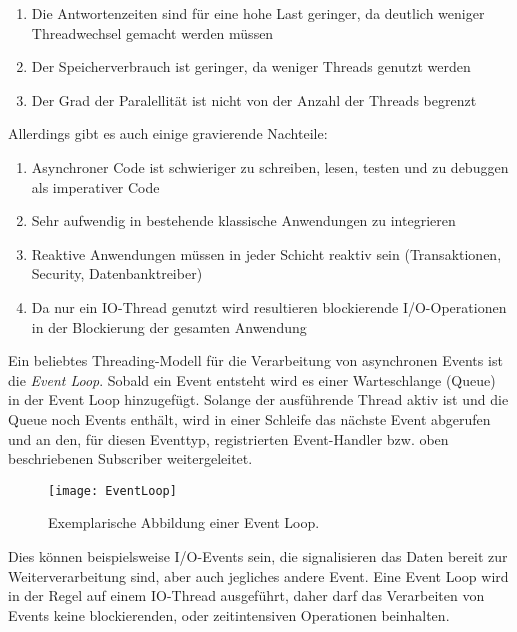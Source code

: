 \begin{enumerate}
    \item Die Antwortenzeiten sind für eine hohe Last geringer, da deutlich weniger Threadwechsel gemacht werden müssen
    \item Der Speicherverbrauch ist geringer, da weniger Threads genutzt werden
    \item Der Grad der Paralellität ist nicht von der Anzahl der Threads begrenzt
\end{enumerate}

Allerdings gibt es auch einige gravierende Nachteile:

\begin{enumerate}
    \item Asynchroner Code ist schwieriger zu schreiben, lesen, testen und zu debuggen als imperativer Code
    \item Sehr aufwendig in bestehende klassische Anwendungen zu integrieren
    \item Reaktive Anwendungen müssen in jeder Schicht reaktiv sein (Transaktionen, Security, Datenbanktreiber)
    \item Da nur ein IO-Thread genutzt wird resultieren blockierende I/O-Operationen in der Blockierung der gesamten Anwendung
\end{enumerate}

Ein beliebtes Threading-Modell für die Verarbeitung von asynchronen Events ist die \textit{Event Loop}.
Sobald ein Event entsteht wird es einer Warteschlange (Queue)
in der Event Loop hinzugefügt. Solange der ausführende Thread aktiv ist und die Queue noch Events enthält, wird in einer Schleife das nächste Event
abgerufen und an den, für diesen Eventtyp, registrierten Event-Handler bzw. oben beschriebenen Subscriber weitergeleitet.
\begin{figure}[h!]
    \centering
    \texttt{[image: EventLoop]}
    \caption{Exemplarische Abbildung einer Event Loop. \parencite[Kapitel 1.7]{Ponge2020}}
\end{figure}

Dies können beispielsweise I/O-Events sein, die signalisieren das Daten bereit zur Weiterverarbeitung sind, aber auch jegliches andere Event.
Eine Event Loop wird in der Regel auf einem IO-Thread ausgeführt, daher darf das Verarbeiten von Events
keine blockierenden, oder zeitintensiven Operationen beinhalten\parencite{Ponge2020}.

